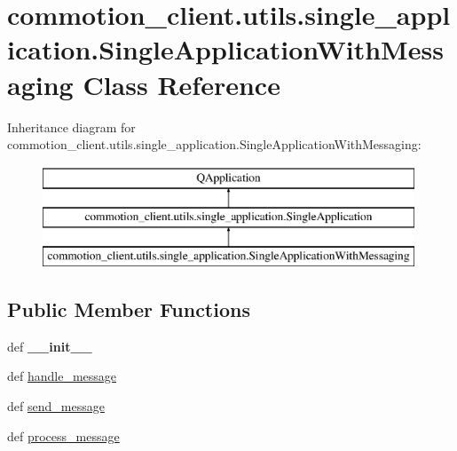\hypertarget{classcommotion__client_1_1utils_1_1single__application_1_1SingleApplicationWithMessaging}{\section{commotion\-\_\-client.\-utils.\-single\-\_\-application.\-Single\-Application\-With\-Messaging Class Reference}
\label{classcommotion__client_1_1utils_1_1single__application_1_1SingleApplicationWithMessaging}
}
Inheritance diagram for commotion\-\_\-client.\-utils.\-single\-\_\-application.\-Single\-Application\-With\-Messaging\-:\begin{figure}[H]
\begin{center}
\leavevmode
\includegraphics[height=3.000000cm]{classcommotion__client_1_1utils_1_1single__application_1_1SingleApplicationWithMessaging}
\end{center}
\end{figure}
\subsection*{Public Member Functions}
\begin{DoxyCompactItemize}
\item 
\hypertarget{classcommotion__client_1_1utils_1_1single__application_1_1SingleApplicationWithMessaging_a267f94646304f99b18a0ade20db51d80}{def {\bfseries \-\_\-\-\_\-init\-\_\-\-\_\-}}\label{classcommotion__client_1_1utils_1_1single__application_1_1SingleApplicationWithMessaging_a267f94646304f99b18a0ade20db51d80}

\item 
def \hyperlink{classcommotion__client_1_1utils_1_1single__application_1_1SingleApplicationWithMessaging_a1289d2bf53f8a3647dd9bce62bd877e6}{handle\-\_\-message}
\item 
def \hyperlink{classcommotion__client_1_1utils_1_1single__application_1_1SingleApplicationWithMessaging_a07475e0643ef2f92a0e990e7feefa4e3}{send\-\_\-message}
\item 
def \hyperlink{classcommotion__client_1_1utils_1_1single__application_1_1SingleApplicationWithMessaging_af0bf77fe13d6cd9e27d13927f4dcaae4}{process\-\_\-message}
\end{DoxyCompactItemize}

